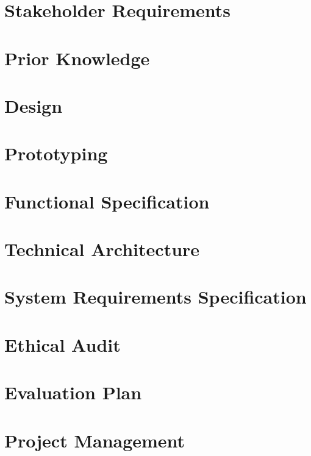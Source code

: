 \documentclass[12pt]{report}
\begin{document}
\chapter{Stakeholder Requirements}



\chapter{Prior Knowledge}



\chapter{Design}



\chapter{Prototyping}



\chapter{Functional Specification}



\chapter{Technical Architecture}



\chapter{System Requirements Specification}



\chapter{Ethical Audit}



\chapter{Evaluation Plan}



\chapter{Project Management}

\end{document}
